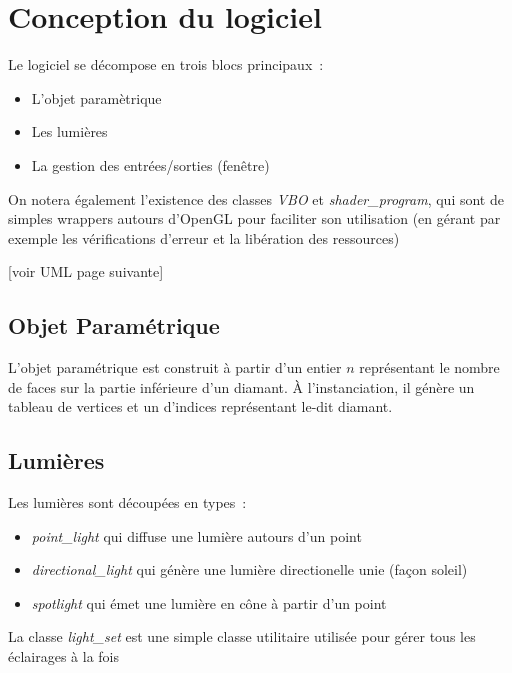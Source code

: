 
\section{Conception du logiciel}

Le logiciel se décompose en trois blocs principaux~:
\begin{itemize}
    \item L'objet paramètrique
    \item Les lumières
    \item La gestion des entrées/sorties (fenêtre)
\end{itemize}

On notera également l'existence des classes \textit{VBO} et \textit{shader\_program}, qui sont de
simples wrappers autours d'OpenGL pour faciliter son utilisation (en gérant par exemple
les vérifications d'erreur et la libération des ressources)

[voir UML page suivante]

\begin{landscape}
    \thispagestyle{empty}
    \begin{figure}[h]
        \centering
    \end{figure}
\end{landscape}

\subsection{Objet Paramétrique}

L'objet paramétrique est construit à partir d'un entier \(n\) représentant le
nombre de faces sur la partie inférieure d'un diamant. À l'instanciation, il génère un
tableau de vertices et un d'indices représentant le-dit diamant.

\subsection{Lumières}

Les lumières sont découpées en types~:
\begin{itemize}
    \item \textit{point\_light} qui diffuse une lumière autours d'un point
    \item \textit{directional\_light} qui génère une lumière directionelle
        unie (façon soleil)
    \item \textit{spotlight} qui émet une lumière en cône à partir d'un point
\end{itemize}
La classe \textit{light\_set} est une simple classe utilitaire utilisée pour
gérer tous les éclairages à la fois

